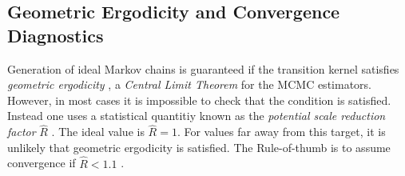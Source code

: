 \subsection{Geometric Ergodicity and Convergence Diagnostics}
Generation of ideal Markov chains is guaranteed if the transition kernel satisfies \textit{geometric ergodicity} \cite{geometric_ergodicity}, a \textit{Central Limit Theorem} for the MCMC estimators.
However, in most cases it is impossible to check that the condition is satisfied. Instead one uses a statistical quantitiy known
as the \textit{potential scale reduction factor} $\hat{R}$ \cite{rhat}. The ideal value is $\hat{R} = 1$. For values far away from this target,
it is unlikely that geometric ergodicity is satisfied. The Rule-of-thumb is to assume convergence
if $\hat{R} < 1.1$ \cite{convergence_diagnostics}.



